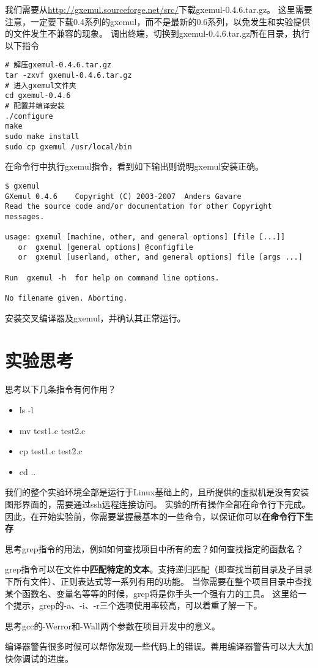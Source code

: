我们需要从\url{http://gxemul.sourceforge.net/src/}下载gxemul-0.4.6.tar.gz。
这里需要注意，一定要下载0.4系列的gxemul，而不是最新的0.6系列，以免发生和实验提供的文件发生不兼容的现象。
调出终端，切换到gxemul-0.4.6.tar.gz所在目录，执行以下指令

\begin{verbatim}
# 解压gxemul-0.4.6.tar.gz
tar -zxvf gxemul-0.4.6.tar.gz
# 进入gxemul文件夹
cd gxemul-0.4.6
# 配置并编译安装
./configure
make
sudo make install
sudo cp gxemul /usr/local/bin
\end{verbatim}

在命令行中执行gxemul指令，看到如下输出则说明gxemul安装正确。

\begin{verbatim}
$ gxemul
GXemul 0.4.6    Copyright (C) 2003-2007  Anders Gavare
Read the source code and/or documentation for other Copyright messages.

usage: gxemul [machine, other, and general options] [file [...]]
   or  gxemul [general options] @configfile
   or  gxemul [userland, other, and general options] file [args ...]

Run  gxemul -h  for help on command line options.

No filename given. Aborting.
\end{verbatim}

\begin{exercise}
安装交叉编译器及gxemul，并确认其正常运行。
\end{exercise}

\section{实验思考}

\begin{thinking}
思考以下几条指令有何作用？
  \begin{itemize}
    \item ls -l
    \item mv test1.c test2.c
    \item cp test1.c test2.c
    \item cd ..
  \end{itemize}
\end{thinking}
我们的整个实验环境全部是运行于Linux基础上的，且所提供的虚拟机是没有安装图形界面的，需要通过ssh远程连接访问。
实验的所有操作全部在命令行下完成。因此，在开始实验前，你需要掌握最基本的一些命令，以保证你可以\textbf{在命令行下生存}

\begin{thinking}
思考grep指令的用法，例如如何查找项目中所有的宏？如何查找指定的函数名？
\end{thinking}
grep指令可以在文件中\textbf{匹配特定的文本}。支持递归匹配（即查找当前目录及子目录下所有文件）、正则表达式等一系列有用的功能。
当你需要在整个项目目录中查找某个函数名、变量名等等的时候，grep将是你手头一个强有力的工具。
这里给一个提示，grep的-a、-i、-r三个选项使用率较高，可以着重了解一下。

\begin{thinking}
思考gcc的-Werror和-Wall两个参数在项目开发中的意义。
\end{thinking}
编译器警告很多时候可以帮你发现一些代码上的错误。善用编译器警告可以大大加快你调试的进度。
